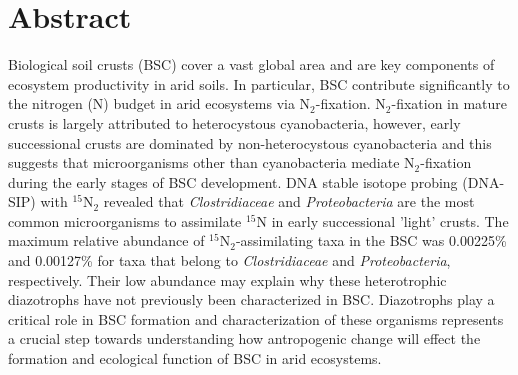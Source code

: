 \section{Abstract}
Biological soil crusts (BSC) cover a vast global area and are key components of
ecosystem productivity in arid soils. In particular, BSC contribute
significantly to the nitrogen (N) budget in arid ecosystems via
N$_{2}$-fixation.  N$_{2}$-fixation in mature crusts is largely attributed to
heterocystous cyanobacteria, however, early successional crusts are dominated
by non-heterocystous cyanobacteria and this suggests that microorganisms other
than cyanobacteria mediate N$_{2}$-fixation during the early stages of BSC
development. DNA stable isotope probing (DNA-SIP) with $^{15}$N$_{2}$ revealed
that \textit{Clostridiaceae} and \textit{Proteobacteria} are the most common
microorganisms to assimilate $^{15}$N in early successional 'light' crusts.
The maximum relative abundance of $^{15}$N$_{2}$-assimilating taxa in the BSC
was 0.00225\% and 0.00127\% for taxa that belong to \textit{Clostridiaceae} and
\textit{Proteobacteria}, respectively. Their low abundance may explain why
these heterotrophic diazotrophs have not previously been characterized in BSC.
Diazotrophs play a critical role in BSC formation and characterization of these
organisms represents a crucial step towards understanding how antropogenic
change will effect the formation and ecological function of BSC in arid
ecosystems.


